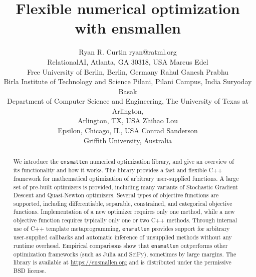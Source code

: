 \documentclass[twoside,11pt]{article}
\begin{document}
\title{Flexible numerical optimization with ensmallen}

\author{\name Ryan R. Curtin \email ryan@ratml.org \\
       \addr RelationalAI, Atlanta, GA 30318, USA
       \AND
       \name Marcus Edel\\
       \addr Free University of Berlin, Berlin, Germany
       \AND
       \name Rahul Ganesh Prabhu \\
       \addr Birla Institute of Technology and Science Pilani, Pilani Campus, India
       \AND
       \name Suryoday Basak \\
       \addr Department of Computer Science and Engineering, The University of
Texas at Arlington,\\
       Arlington, TX, USA %
       \AND
       \name Zhihao Lou \\
       \addr Epsilon, Chicago, IL, USA
       \AND
       \name Conrad Sanderson \\
       \addr Griffith University, Australia}


\maketitle

\begin{abstract}%
We introduce the {\tt ensmallen} numerical optimization library, and give an
overview of its functionality and how it works.
The library provides a fast and flexible C++ framework
for mathematical optimization of arbitrary user-supplied functions.
A large set of pre-built optimizers is provided,
including many variants of Stochastic Gradient Descent and Quasi-Newton optimizers.
Several types of objective functions are supported, including differentiable,
separable, constrained, and categorical objective functions.
Implementation of a new optimizer requires only one method,
while a new objective function requires typically only one or two C++ methods.
Through internal use of C++ template metaprogramming, {\tt ensmallen} provides support for arbitrary
user-supplied callbacks and automatic inference of unsupplied methods without
any runtime overhead.
Empirical comparisons show that {\tt ensmallen}
outperforms other optimization frameworks (such as Julia and SciPy), sometimes
by large margins.  The library is available at \url{https://ensmallen.org}
and is distributed under the permissive BSD license.

\end{abstract}
\end{document}
